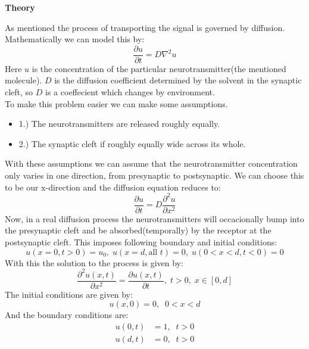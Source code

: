 \documentclass[a4paper,11pt]{article}
\newcommand{\prtl}{\partial}
\newcommand{\vsp}{\vspace{0.2cm}}
\newcommand{\secti}[1]{\begin{center} \Large\bf{{#1}} \end{center}}
\begin{document}
\secti{Theory}
    As mentioned the process of transporting the signal is governed by diffusion. Mathematically we can model this by:
    \begin{equation*}
        \frac{\prtl u}{\prtl t} = D\nabla^2 u
    \end{equation*}
    Here $u$ is the concentration of the particular neurotransmitter(the mentioned molecule). $D$ is the diffusion coefficient determined by the solvent in the synaptic cleft, so $D$ is a coeffecient which changes by environment.\vsp\\
    To make this problem easier we can make some assumptions.
        \begin{itemize}
            \item 1.) The neurotransmitters are released roughly equally.
            \item 2.) The synaptic cleft if roughly equally wide across its whole.
        \end{itemize}
    With these assumptions we can assume that the neurotransmitter concentration only varies in one direction, from presynaptic to postsynaptic. We can choose this to be our x-direction and the diffusion equation reduces to:
    \begin{equation*}
        \frac{\prtl u}{\prtl t} = D\frac{\prtl^2 u}{\prtl x^2}
    \end{equation*}
    Now, in a real diffusion process the neurotransmitters will occacionally bump into the presynaptic cleft and be absorbed(temporally) by the receptor at the postsynaptic cleft. This imposes following boundary and initial conditions:
    \begin{equation*}
        u(x=0,t>0)=u_0,\; u(x=d,\mbox{all $t$})=0,\; u(0<x<d, t<0)=0
    \end{equation*}
    With this the solution to the process is given by:
    \begin{equation*}
        \frac{\prtl^2 u(x,t)}{\prtl x^2} = \frac{\prtl u(x,t)}{\prtl t},\; t>0,\; x\in [0,d]
    \end{equation*}
    The initial conditions are given by:
    \begin{equation*}
        u(x,0) = 0,\;\; 0<x<d
    \end{equation*}
    And the boundary conditions are:
    \begin{align*}
        u(0,t) &= 1,\;\; t>0\\
        u(d,t) &= 0,\;\; t>0
    \end{align*}
\end{document}
